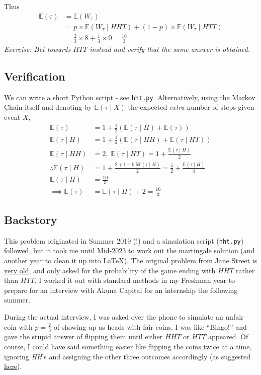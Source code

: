 \documentclass[11pt]{article}
\newcommand{\E}{\mathbb{E}}
\begin{document}
Thus 
\begin{align*}
\E(\tau) &= \E(W_\tau) \\
&= p\times \E(W_\tau\mid HHT) + (1-p)\times \E(W_\tau\mid HTT) \\
&=\frac{2}{3} \times 8 + \frac{1}{3} \times 0 = \boxed{\frac{16}{3}}
\end{align*}
\textit{Exercise: Bet towards $HTT$ instead and verify that the same answer is obtained.}
\subsection{Verification}
We can write a short Python script - see \texttt{hht.py}. Alternatively, using the Markov Chain itself and denoting by $\E(\tau\mid X)$ the expected \emph{extra} number of steps given event $X$,
\begin{align*}
\E(\tau) &= 1 + \frac{1}{2}\left(\E(\tau\mid H) + \E(\tau)\right) \\
\E(\tau\mid H) &= 1 + \frac{1}{2}\left(\E(\tau\mid HH) + \E(\tau\mid HT)\right) \\
\E(\tau\mid HH) &= 2, \;\E(\tau\mid HT) = 1 + \frac{\E(\tau\mid H)}{2} \\
\therefore \E(\tau\mid H) &= 1 + \frac{2 + 1 + 0.5\E(\tau\mid H)}{2} = \frac{5}{2} + \frac{\E(\tau\mid H)}{4} \\
\E(\tau\mid H) &= \frac{10}{3} \\
\implies\E(\tau) &= \E(\tau\mid H) + 2 = \boxed{\frac{16}{3}}
\end{align*}

\subsection{Backstory}
This problem originated in Summer 2019 (!) and a simulation script (\texttt{hht.py}) followed, but it took me until Mid-2023 to work out the martingale solution (and another year to clean it up into \LaTeX). The original problem from Jane Street is \href{https://www.glassdoor.com/Interview/Flip-a-coin-until-either-HHT-or-HTT-appears-Is-one-more-likely-to-appear-first-If-so-which-one-and-with-what-probabili-QTN_46824.htm}{very old}, and only asked for the probability of the game ending with $HHT$ rather than $HTT$. I worked it out with standard methods in my Freshman year to prepare for an interview with Akuna Capital for an internship the following summer.

During the actual interview, I was asked over the phone to simulate an unfair coin with $p = \frac{2}{3}$ of showing up as heads with fair coins. I was like ``Bingo!'' and gave the stupid answer of flipping them until either $HHT$ or $HTT$ appeared. Of course, I could have said something easier like flipping the coins twice at a time, ignoring \textit{HH}'s and assigning the other three outcomes accordingly (as suggested \href{https://mindyourdecisions.com/blog/2017/01/01/can-you-solve-it-use-a-coin-to-simulate-any-probability-sunday-puzzle/}{here}).
\end{document}

